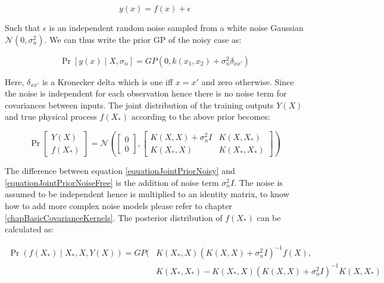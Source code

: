 \begin{equation}\label{eqNoiseEquation}
y(x) = f(x) + \epsilon
\end{equation}

Such that $\epsilon$ is an independent random noise sampled from a white noise Gaussian $\mathcal{N}(0, \sigma_{n}^{2})$. We can thus write the prior GP of the noisy case as:

\begin{equation}\label{equationMeanZeroGPNoisydefinition}
\Pr[y(x) \mid X, \sigma_{n}] = GP(0 , k(x_{1}, x_{2}) + \sigma^{2}_{n}\delta_{xx'})
\end{equation}

Here, $\delta_{xx'}$ is a Kronecker delta which is one iff $x = x'$ and zero otherwise. Since the noise is independent for each observation hence there is no noise term for covariances between inputs. The joint distribution of the training outputs $Y(X)$ and true physical process $f(X_{*})$ according to the above prior becomes:

\begin{equation}\label{equationJointPriorNoisy}
\Pr\left [ \begin{matrix}
Y(X)
\\ f(X_{*})
\end{matrix} \right ]
= 
\mathcal{N}\left (
\left [ \begin{matrix}
0
\\ 0

\end{matrix} \right ] , \left [ \begin{matrix}
K(X, X) + \sigma^{2}_{n}I & K(X, X_{*})\\ 
K(X_{*}, X) & K(X_{*}, X_{*})
\end{matrix} \right ] 
\right )
\end{equation}

The difference between equation \ref{equationJointPriorNoisy} and \ref{equationJointPriorNoiseFree} is the addition of noise term $\sigma^{2}_{n}I$. The noise is assumed to be independent hence is multiplied to an identity matrix, to know how to add more complex noise models please refer to chapter \ref{chapBasicCovarianceKernels}. The posterior distribution of $f(X_{*})$ can be calculated as:

  \begin{equation}\label{eqNoisyPredictiveGP}
  \begin{aligned}
      \Pr(f(X_{*}) \mid X_{*}, X, Y(X)) = GP(  & K(X_{*}, X)( K(X, X) + \sigma^{2}_{n}I)^{-1}f(X),   \\ 
                                & K(X_{*}, X_{*}) - K(X_{*}, X)( K(X, X) + \sigma^{2}_{n}I)^{-1} K(X, X_{*}) 
  \end{aligned}
  \end{equation}

